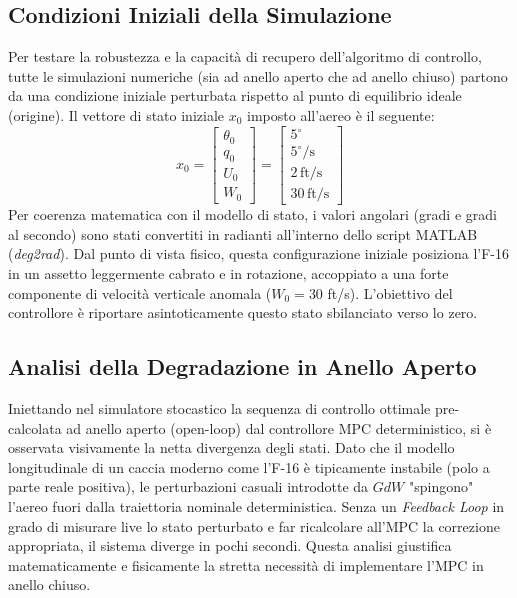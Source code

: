 \documentclass[12pt,a4paper]{article}
\begin{document}
\subsection{Condizioni Iniziali della Simulazione}
Per testare la robustezza e la capacità di recupero dell'algoritmo di controllo, tutte le simulazioni numeriche (sia ad anello aperto che ad anello chiuso) partono da una condizione iniziale perturbata rispetto al punto di equilibrio ideale (origine). Il vettore di stato iniziale $x_0$ imposto all'aereo è il seguente:
\begin{equation}
    x_0 = \begin{bmatrix} \theta_0 \\ q_0 \\ U_0 \\ W_0 \end{bmatrix} = \begin{bmatrix} 5^\circ \\ 5^\circ/\text{s} \\ 2 \, \text{ft/s} \\ 30 \, \text{ft/s} \end{bmatrix}
\end{equation}
Per coerenza matematica con il modello di stato, i valori angolari (gradi e gradi al secondo) sono stati convertiti in radianti all'interno dello script MATLAB (\textit{deg2rad}). Dal punto di vista fisico, questa configurazione iniziale posiziona l'F-16 in un assetto leggermente cabrato e in rotazione, accoppiato a una forte componente di velocità verticale anomala ($W_0 = 30$ ft/s). L'obiettivo del controllore è riportare asintoticamente questo stato sbilanciato verso lo zero.

\subsection{Analisi della Degradazione in Anello Aperto}
Iniettando nel simulatore stocastico la sequenza di controllo ottimale pre-calcolata ad anello aperto (open-loop) dal controllore MPC deterministico, si è osservata visivamente la netta divergenza degli stati. Dato che il modello longitudinale di un caccia moderno come l'F-16 è tipicamente instabile (polo a parte reale positiva), le perturbazioni casuali introdotte da $G dW$ "spingono" l'aereo fuori dalla traiettoria nominale deterministica. Senza un \textit{Feedback Loop} in grado di misurare live lo stato perturbato e far ricalcolare all'MPC la correzione appropriata, il sistema diverge in pochi secondi. Questa analisi giustifica matematicamente e fisicamente la stretta necessità di implementare l'MPC in anello chiuso.
\end{document}
